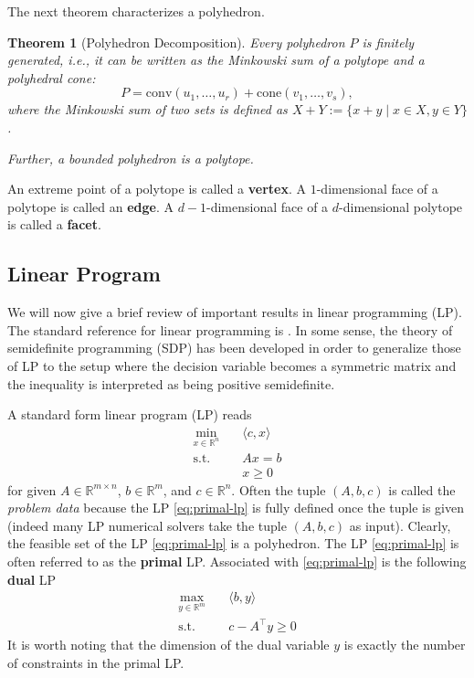 \documentclass[
]{book}
\newtheorem{theorem}{Theorem}[chapter]
\theoremstyle{definition}
\theoremstyle{definition}
\theoremstyle{definition}
\theoremstyle{definition}
\theoremstyle{remark}
\begin{document}
The next theorem characterizes a polyhedron.

\begin{theorem}[Polyhedron Decomposition]
\protect\hypertarget{thm:DecomposePolyhedron}{}\label{thm:DecomposePolyhedron}Every polyhedron \(P\) is finitely generated, i.e., it can be written as the Minkowski sum of a polytope and a polyhedral cone:
\[
P = \mathrm{conv}(u_1,\dots,u_r) + \mathrm{cone}(v_1,\dots,v_s),
\]
where the Minkowski sum of two sets is defined as \(X + Y := \{ x+y \mid x \in X, y \in Y \}\).

Further, a bounded polyhedron is a polytope.
\end{theorem}

An extreme point of a polytope is called a \textbf{vertex}. A \(1\)-dimensional face of a polytope is called an \textbf{edge}. A \(d-1\)-dimensional face of a \(d\)-dimensional polytope is called a \textbf{facet}.

\subsection{Linear Program}\label{linear-program}

We will now give a brief review of important results in linear programming (LP). The standard reference for linear programming is \citep{bertsimas97book-lp}. In some sense, the theory of semidefinite programming (SDP) has been developed in order to generalize those of LP to the setup where the decision variable becomes a symmetric matrix and the inequality is interpreted as being positive semidefinite.

A standard form linear program (LP) reads
\begin{equation}
\begin{split}
\min_{x \in \mathbb{R}^{n}} & \quad \langle c, x \rangle  \\
\mathrm{s.t.}& \quad Ax = b \\
& \quad x \geq 0
\end{split}
\label{eq:primal-lp}
\end{equation}
for given \(A \in \mathbb{R}^{m\times n}\), \(b \in \mathbb{R}^{m}\), and \(c \in \mathbb{R}^{n}\). Often the tuple \((A,b,c)\) is called the \emph{problem data} because the LP \eqref{eq:primal-lp} is fully defined once the tuple is given (indeed many LP numerical solvers take the tuple \((A,b,c)\) as input). Clearly, the feasible set of the LP \eqref{eq:primal-lp} is a polyhedron. The LP \eqref{eq:primal-lp} is often referred to as the \textbf{primal} LP. Associated with \eqref{eq:primal-lp} is the following \textbf{dual} LP
\begin{equation}
\begin{split}
\max_{y \in \mathbb{R}^{m}} & \quad \langle b, y \rangle \\
\mathrm{s.t.}& \quad c - A^\top y \geq 0
\end{split}
\label{eq:dual-lp}
\end{equation}
It is worth noting that the dimension of the dual variable \(y\) is exactly the number of constraints in the primal LP.
\end{document}
